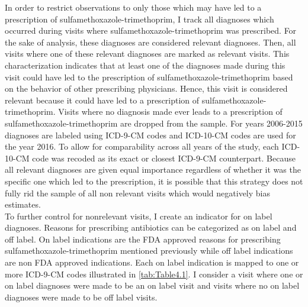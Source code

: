 \indent In order to restrict observations to only those which may have led to a prescription of sulfamethoxazole-trimethoprim, I track all diagnoses which occurred during visits where sulfamethoxazole-trimethoprim was prescribed. For the sake of analysis, these diagnoses are considered relevant diagnoses. Then, all visits where one of these relevant diagnoses are marked as relevant visits. This characterization indicates that at least one of the diagnoses made during this visit could have led to the prescription of sulfamethoxazole-trimethoprim based on the behavior of other prescribing physicians. Hence, this visit is considered relevant because it could have led to a prescription of sulfamethoxazole-trimethoprim. Visits where no diagnosis made ever leads to a prescription of sulfamethoxazole-trimethoprim are dropped from the sample. For years 2006-2015 diagnoses are labeled using ICD-9-CM codes and ICD-10-CM codes are used for the year 2016. To allow for comparability across all years of the study, each ICD-10-CM code was recoded as its exact or closest ICD-9-CM counterpart. Because all relevant diagnoses are given equal importance regardless of whether it was the specific one which led to the prescription, it is possible that this strategy does not fully rid the sample of all non relevant visits which would negatively bias estimates.\\
\indent To further control for nonrelevant visits, I create an indicator for on label diagnoses. Reasons for prescribing antibiotics can be categorized as on label and off label. On label indications are the FDA approved reasons for prescribing sulfamethoxazole-trimethoprim mentioned previously while off label indications are non FDA approved indications. Each on label indication is mapped to one or more ICD-9-CM codes illustrated in \autoref{tab:Table4.1}. I consider a visit where one or on label diagnoses were made to be an on label visit and visits where no on label diagnoses were made to be off label visits. 


